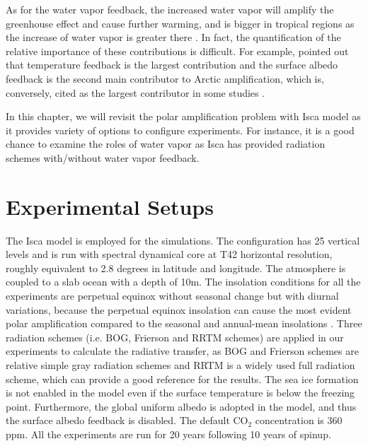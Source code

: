 As for the water vapor feedback, the increased water vapor will amplify the greenhouse effect and cause further warming, and is bigger in tropical regions as the increase of water vapor is greater there \citep{Taylor2013, Pithan2014}. In fact, the quantification of the relative importance of these contributions is difficult. For example, \cite{Pithan2014} pointed out that temperature feedback is the largest contribution and the surface albedo feedback is the second main contributor to Arctic amplification, which is, conversely, cited as the largest contributor in some studies \citep[e.g.,][]{Manabe1975,Winton2006amplified,Hall2004}.


In this chapter, we will revisit the polar amplification problem with Isca model as it provides variety of options to configure experiments. For instance, it is a good chance to examine the roles of water vapor as Isca has provided radiation schemes with/without water vapor feedback.


\section{Experimental Setups} \label{sec:setup}

The Isca model is employed for the simulations. The configuration has 25 vertical levels and is run with spectral dynamical core at T42 horizontal resolution, roughly equivalent to 2.8 degrees in latitude and longitude. The atmosphere is coupled to a slab ocean with a depth of 10m. The insolation conditions for all the experiments are perpetual equinox without seasonal change but with diurnal variations, because the perpetual equinox insolation can cause the most evident polar amplification compared to the seasonal and annual-mean insolations \citep{Kim2018}. Three radiation schemes (i.e. BOG, Frierson and RRTM schemes) are applied in our experiments to calculate the radiative transfer, as BOG and Frierson schemes are relative simple gray radiation schemes and RRTM is a widely used full radiation scheme, which can provide a good reference for the results. The sea ice formation is not enabled in the model even if the surface temperature is below the freezing point. Furthermore, the global uniform albedo is adopted in the model, and thus the surface albedo feedback is disabled. The default CO$_2$ concentration is 360 ppm. All the experiments are run for 20 years following 10 years of spinup.

